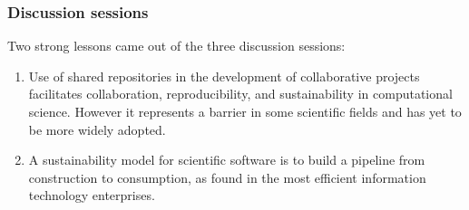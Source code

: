 \documentclass[11pt, oneside]{amsart}
\newcommand{\note}[1]{ {\textcolor{red}    { #1 }}}
\begin{document}
\subsubsection*{Discussion sessions}

Two strong lessons came out of the three discussion sessions:

\begin{enumerate}
\item Use of shared repositories in the development of collaborative 
projects facilitates collaboration, reproducibility, and sustainability 
in computational science. However it represents a barrier in some scientific fields and 
has yet to be more widely adopted.




\item A sustainability model for scientific software is to build a pipeline
from construction to consumption, as found in the most efficient
information technology enterprises.

\end{enumerate}

\end{document}
